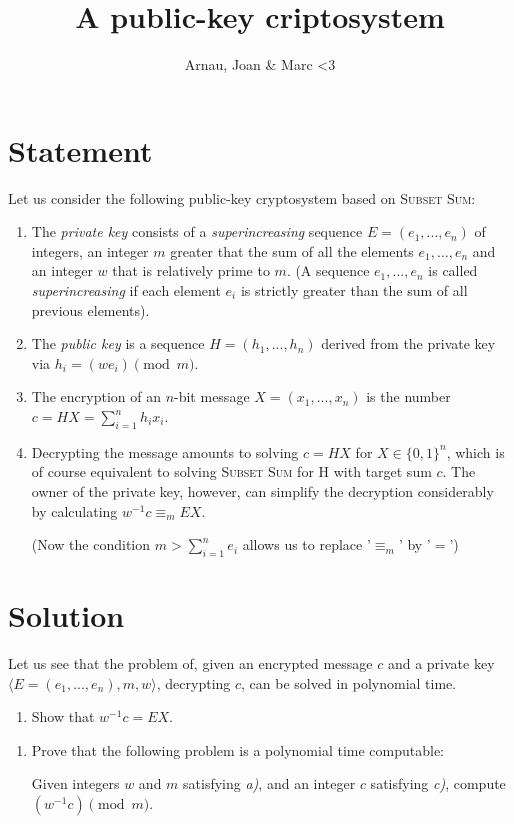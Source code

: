 \documentclass[a4paper]{article}
\title{A public-key criptosystem}
\author{Arnau, Joan \& Marc  <3}
\begin{document}
\maketitle
\section*{Statement}
Let us consider the following public-key cryptosystem based on \textsc{Subset Sum}:

\begin{enumerate}[label=\alph*)]
	\item The \emph{private key} consists of a \emph{superincreasing} sequence $E = (e_1, ..., e_n)$ of integers, an integer $m$ greater that the sum of all the elements $e_1, ..., e_n$ and an integer $w$ that is relatively prime to $m$. (A sequence $e_1, ..., e_n$ is called \emph{superincreasing} if each element $e_i$ is strictly greater than the sum of all previous elements).
	\item The \emph{public key} is a sequence $H = (h_1, ..., h_n)$ derived from the private key via $h_i = (we_i) \pmod{m}$.
	\item The encryption of an $n$-bit message $X = (x_1, ..., x_n)$ is the number $c = HX = \sum_{i=1}^n h_ix_i$.
	\item Decrypting the message amounts to solving $c = HX$ for $X \in \{0, 1\}^n$, which is of course equivalent to solving \textsc{Subset Sum} for H with target sum $c$. The owner of the private key, however, can simplify the decryption considerably by calculating $w^{-1}c \equiv_m EX$.
	
	(Now the condition $m > \sum_{i=1}^n e_i$ allows us to replace '$\equiv_m$' by '$=$')
\end{enumerate}

\section*{Solution}
Let us see that the problem of, given an encrypted message $c$ and a private key $\langle E = (e_1, ..., e_n), m, w \rangle$, decrypting $c$, can be solved in polynomial time.
\begin{enumerate}[label=\roman*)]
	\item Show that $w^{-1}c = EX$.
\end{enumerate}

\begin{enumerate}[resume, label=\roman*)]
	\item Prove that the following problem is a polynomial time computable:
	
	Given integers $w$ and $m$ satisfying \emph{a)}, and an integer $c$ satisfying \emph{c)}, compute $(w^{-1}c) \pmod{m}$.
\end{enumerate}
\end{document}
